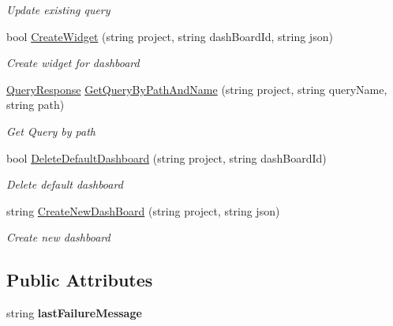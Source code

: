 \begin{DoxyCompactItemize}
\begin{DoxyCompactList}\small\item\em Update existing query \end{DoxyCompactList}\item 
bool \mbox{\hyperlink{class_vsts_rest_a_p_i_1_1_querys_and_widgets_1_1_querys_a6e8876d7b58b992e3cde03d1c13e3d5a}{Create\+Widget}} (string project, string dash\+Board\+Id, string json)
\begin{DoxyCompactList}\small\item\em Create widget for dashboard \end{DoxyCompactList}\item 
\mbox{\hyperlink{class_vsts_rest_a_p_i_1_1_viewmodel_1_1_querys_and_widgets_1_1_query_response}{Query\+Response}} \mbox{\hyperlink{class_vsts_rest_a_p_i_1_1_querys_and_widgets_1_1_querys_a8cf2beece89d16eb8b96e0c3c34142b2}{Get\+Query\+By\+Path\+And\+Name}} (string project, string query\+Name, string path)
\begin{DoxyCompactList}\small\item\em Get Query by path \end{DoxyCompactList}\item 
bool \mbox{\hyperlink{class_vsts_rest_a_p_i_1_1_querys_and_widgets_1_1_querys_adc1b3bd0066fd1340db2fbf49b56934f}{Delete\+Default\+Dashboard}} (string project, string dash\+Board\+Id)
\begin{DoxyCompactList}\small\item\em Delete default dashboard \end{DoxyCompactList}\item 
string \mbox{\hyperlink{class_vsts_rest_a_p_i_1_1_querys_and_widgets_1_1_querys_a819bd19bb1d6657c86418a3f3ef3c86b}{Create\+New\+Dash\+Board}} (string project, string json)
\begin{DoxyCompactList}\small\item\em Create new dashboard \end{DoxyCompactList}\end{DoxyCompactItemize}
\subsection*{Public Attributes}
\begin{DoxyCompactItemize}
\item 
\mbox{\label{class_vsts_rest_a_p_i_1_1_querys_and_widgets_1_1_querys_a2409c19fabbee091d0252ab43a9f20a7}} 
string {\bfseries last\+Failure\+Message}
\end{DoxyCompactItemize}


